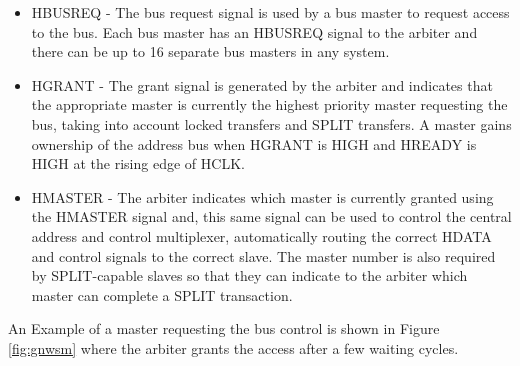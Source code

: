  \begin{itemize}

\item  {HBUSREQ - } The bus request signal is used by a bus master to request access to the bus. Each bus master has an HBUSREQ signal to the arbiter and there can be up to 16 separate bus masters in any system.


\item  {HGRANT - } The grant signal is generated by the arbiter and indicates that the appropriate master is currently the highest priority master requesting the bus, taking into account locked transfers and SPLIT transfers. A master gains ownership of the address bus when HGRANT is HIGH and HREADY is HIGH at the rising edge of HCLK.

\item  {HMASTER - } The arbiter indicates which master is currently granted using the HMASTER signal and,  this same signal can be used to control the central address and control multiplexer, automatically routing the correct HDATA and control signals to the correct slave. The master number is also required by SPLIT-capable slaves so that they can indicate to the arbiter which master can complete a SPLIT transaction.


\end{itemize}

An Example of a master requesting the bus control is shown in Figure \ref{fig:gnwsm} where the arbiter grants the access after a few waiting cycles.


